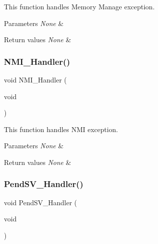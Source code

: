 This function handles Memory Manage exception. 


\begin{DoxyParams}{Parameters}
{\em None} & \\
\hline
\end{DoxyParams}

\begin{DoxyRetVals}{Return values}
{\em None} & \\
\hline
\end{DoxyRetVals}
\mbox{\label{group__UART__TwoBoards__ComIT_gaeddaa97a139c92c174f5fcccedc2859b}} 
\subsubsection{\texorpdfstring{N\+M\+I\+\_\+\+Handler()}{NMI\_Handler()}}
{\footnotesize\ttfamily void N\+M\+I\+\_\+\+Handler (\begin{DoxyParamCaption}\item[{void}]{ }\end{DoxyParamCaption})}



This function handles N\+MI exception. 


\begin{DoxyParams}{Parameters}
{\em None} & \\
\hline
\end{DoxyParams}

\begin{DoxyRetVals}{Return values}
{\em None} & \\
\hline
\end{DoxyRetVals}
\mbox{\label{group__UART__TwoBoards__ComIT_ga6d82249321d9799b28fd83553671f901}} 
\subsubsection{\texorpdfstring{Pend\+S\+V\+\_\+\+Handler()}{PendSV\_Handler()}}
{\footnotesize\ttfamily void Pend\+S\+V\+\_\+\+Handler (\begin{DoxyParamCaption}\item[{void}]{ }\end{DoxyParamCaption})}



